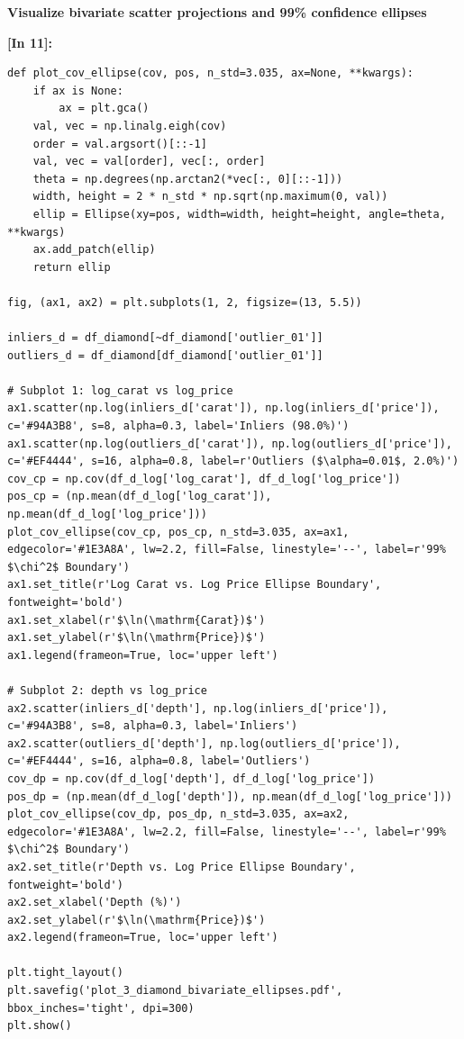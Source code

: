 \vspace{0.3em}
\begin{tcolorbox}[colback=gray!5!white,colframe=gray!50!black,boxrule=0.5pt,arc=2pt,left=5pt,right=5pt,top=2pt,bottom=2pt,unbreakable,before upper={\sloppy\raggedright}]
{\small\bfseries Visualize bivariate scatter projections and 99\% confidence ellipses\par}
\end{tcolorbox}
\vspace{0.2em}
\vspace{0.4em}
\noindent\textbf{\small [In 11]:}
\begin{lstlisting}[style=pycode]
def plot_cov_ellipse(cov, pos, n_std=3.035, ax=None, **kwargs):
    if ax is None:
        ax = plt.gca()
    val, vec = np.linalg.eigh(cov)
    order = val.argsort()[::-1]
    val, vec = val[order], vec[:, order]
    theta = np.degrees(np.arctan2(*vec[:, 0][::-1]))
    width, height = 2 * n_std * np.sqrt(np.maximum(0, val))
    ellip = Ellipse(xy=pos, width=width, height=height, angle=theta, **kwargs)
    ax.add_patch(ellip)
    return ellip

fig, (ax1, ax2) = plt.subplots(1, 2, figsize=(13, 5.5))

inliers_d = df_diamond[~df_diamond['outlier_01']]
outliers_d = df_diamond[df_diamond['outlier_01']]

# Subplot 1: log_carat vs log_price
ax1.scatter(np.log(inliers_d['carat']), np.log(inliers_d['price']), c='#94A3B8', s=8, alpha=0.3, label='Inliers (98.0%)')
ax1.scatter(np.log(outliers_d['carat']), np.log(outliers_d['price']), c='#EF4444', s=16, alpha=0.8, label=r'Outliers ($\alpha=0.01$, 2.0%)')
cov_cp = np.cov(df_d_log['log_carat'], df_d_log['log_price'])
pos_cp = (np.mean(df_d_log['log_carat']), np.mean(df_d_log['log_price']))
plot_cov_ellipse(cov_cp, pos_cp, n_std=3.035, ax=ax1, edgecolor='#1E3A8A', lw=2.2, fill=False, linestyle='--', label=r'99% $\chi^2$ Boundary')
ax1.set_title(r'Log Carat vs. Log Price Ellipse Boundary', fontweight='bold')
ax1.set_xlabel(r'$\ln(\mathrm{Carat})$')
ax1.set_ylabel(r'$\ln(\mathrm{Price})$')
ax1.legend(frameon=True, loc='upper left')

# Subplot 2: depth vs log_price
ax2.scatter(inliers_d['depth'], np.log(inliers_d['price']), c='#94A3B8', s=8, alpha=0.3, label='Inliers')
ax2.scatter(outliers_d['depth'], np.log(outliers_d['price']), c='#EF4444', s=16, alpha=0.8, label='Outliers')
cov_dp = np.cov(df_d_log['depth'], df_d_log['log_price'])
pos_dp = (np.mean(df_d_log['depth']), np.mean(df_d_log['log_price']))
plot_cov_ellipse(cov_dp, pos_dp, n_std=3.035, ax=ax2, edgecolor='#1E3A8A', lw=2.2, fill=False, linestyle='--', label=r'99% $\chi^2$ Boundary')
ax2.set_title(r'Depth vs. Log Price Ellipse Boundary', fontweight='bold')
ax2.set_xlabel('Depth (%)')
ax2.set_ylabel(r'$\ln(\mathrm{Price})$')
ax2.legend(frameon=True, loc='upper left')

plt.tight_layout()
plt.savefig('plot_3_diamond_bivariate_ellipses.pdf', bbox_inches='tight', dpi=300)
plt.show()
\end{lstlisting}
